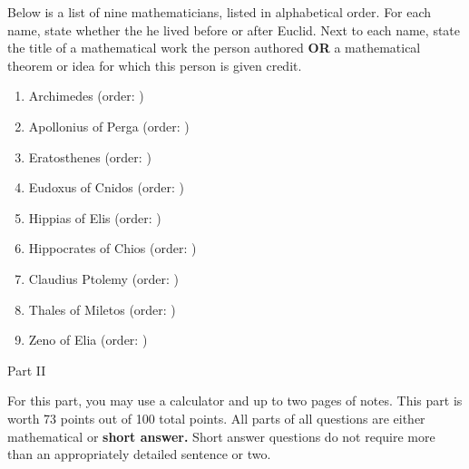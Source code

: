 \documentclass[11pt]{article}
\def\bc{\begin{center}}
\def\ec{\end{center}}
\def\be{\begin{enumerate}}
\def\ee{\end{enumerate}}
\begin{document}
Below is a list of nine mathematicians, listed in alphabetical order. For each name, state whether the he lived before or after Euclid. Next to each name, state the title of a mathematical work the person authored \textbf{OR} a mathematical theorem or idea for which this person is given credit.\\



\be
\item Archimedes (order: \underline{\hspace{1in}})
\vfill

\item Apollonius of Perga (order: \underline{\hspace{1in}})
\vfill

\item Eratosthenes (order: \underline{\hspace{1in}})
\vfill
\item Eudoxus of Cnidos (order: \underline{\hspace{1in}})

\vfill


\item Hippias of Elis (order: \underline{\hspace{1in}})

\vfill
\item Hippocrates of Chios (order: \underline{\hspace{1in}})

\vfill
\item Claudius Ptolemy (order: \underline{\hspace{1in}})

\vfill
\item Thales of Miletos (order: \underline{\hspace{1in}})

\vfill
\item Zeno of Elia (order: \underline{\hspace{1in}})

\vfill
\ee
\newpage 

\bc Part II \ec

For this part, you may use a calculator and up to two pages of notes. This part is worth 73 points out of 100 total points. All parts of all questions are either mathematical or \textbf{short answer.} Short answer questions do not require more than an appropriately detailed sentence or two.
\end{document}

